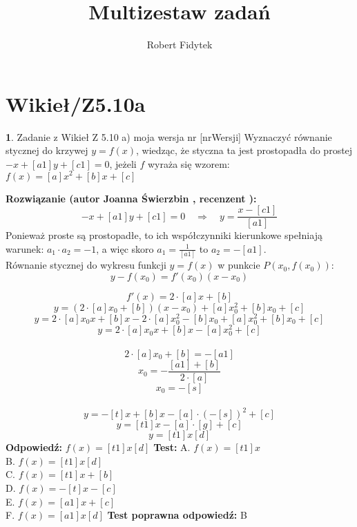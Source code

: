 \documentclass[12pt, a4paper]{article}
\title{Multizestaw zadań}
\author{Robert Fidytek}
\date{}
\theoremstyle{definition} %
\newtheorem{zad}{}
\newcommand{\kategoria}[1]{\section{#1}} %
\newcommand{\zadStart}[1]{\begin{zad}#1\newline} %
\newcommand{\zadStop}{\end{zad}}   %
\newcommand{\rozwStart}[2]{\noindent \textbf{Rozwiązanie (autor #1 , recenzent #2): }\newline} %
\newcommand{\rozwStop}{\newline}                                            %
\newcommand{\odpStart}{\noindent \textbf{Odpowiedź:}\newline}    %
\newcommand{\odpStop}{\newline}                                             %
\newcommand{\testStart}{\noindent \textbf{Test:}\newline} %
\newcommand{\testStop}{\newline} %
\newcommand{\kluczStart}{\noindent \textbf{Test poprawna odpowiedź:}\newline} %
\newcommand{\kluczStop}{\newline} %
\begin{document}
\maketitle


\kategoria{Wikieł/Z5.10a}
\zadStart{Zadanie z Wikieł Z 5.10 a) moja wersja nr [nrWersji]}
Wyznaczyć równanie stycznej do krzywej $y=f(x)$, wiedząc, że styczna ta jest prostopadła do prostej $-x+[a1]y+[c1]=0$, jeżeli $f$ wyraża się wzorem:\\
$f(x)=[a]x^2+[b]x+[c] $
\zadStop
\rozwStart{Joanna Świerzbin}{}
$$
-x+[a1]y+[c1]=0 \quad \Rightarrow \quad y=\frac{x-[c1]}{[a1]}
$$
Ponieważ proste są prostopadłe, to ich współczynniki kierunkowe spełniają warunek: $ a_1 \cdot a_2 =-1$, a więc skoro $a_1 = \frac{1}{[a1]}$ to $ a_2= - [a1]$. \\
Równanie stycznej do wykresu funkcji $y=f(x)$ w punkcie $P(x_0,f(x_0))$:
$$
y-f(x_0)=f'(x_0)(x-x_0)
$$

$$f'(x)=2\cdot[a]x+[b]$$
$$ y = (2\cdot[a]x_0+[b])(x-x_0)+[a]x_0^2+[b]x_0+[c] $$
$$ y = 2\cdot[a]x_0x+[b]x-2\cdot[a]x_0^2-[b]x_0+[a]x_0^2+[b]x_0+[c] $$
$$ y = 2\cdot[a]x_0x+[b]x-[a]x_0^2+[c] $$ \\
$$ 2\cdot [a]x_0+[b] = - [a1] $$
$$ x_0 = - \frac{[a1] + [b]}{2\cdot[a]}$$
$$ x_0 = - [s]$$\\

$$ y = -[t]x+[b]x-[a]\cdot(-[s])^2+[c] $$
$$ y = [t1]x-[a]\cdot[g]+[c] $$
$$ y = [t1]x [d] $$
\rozwStop
\odpStart
$f(x)= [t1]x [d] $
\odpStop
\testStart
A. $f(x)=[t1]x $\\
B. $f(x)=[t1]x [d]$\\
C. $f(x)=[t1]x+[b]$\\
D. $f(x)=-[t]x - [c]$\\
E. $f(x)=[a1]x+ [c]$\\
F. $f(x)=[a1]x [d]$
\testStop
\kluczStart
B
\kluczStop
\end{document}
